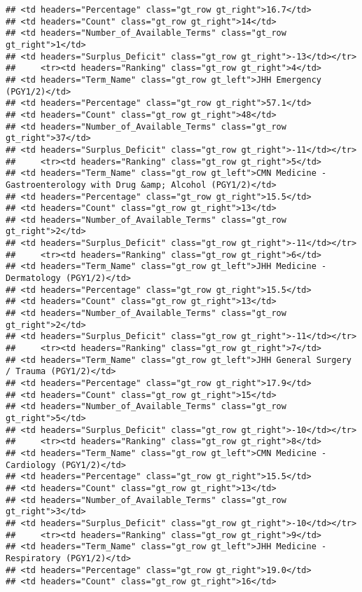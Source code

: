 \documentclass[
]{article}
\begin{document}
\begin{verbatim}
## <td headers="Percentage" class="gt_row gt_right">16.7</td>
## <td headers="Count" class="gt_row gt_right">14</td>
## <td headers="Number_of_Available_Terms" class="gt_row gt_right">1</td>
## <td headers="Surplus_Deficit" class="gt_row gt_right">-13</td></tr>
##     <tr><td headers="Ranking" class="gt_row gt_right">4</td>
## <td headers="Term_Name" class="gt_row gt_left">JHH Emergency (PGY1/2)</td>
## <td headers="Percentage" class="gt_row gt_right">57.1</td>
## <td headers="Count" class="gt_row gt_right">48</td>
## <td headers="Number_of_Available_Terms" class="gt_row gt_right">37</td>
## <td headers="Surplus_Deficit" class="gt_row gt_right">-11</td></tr>
##     <tr><td headers="Ranking" class="gt_row gt_right">5</td>
## <td headers="Term_Name" class="gt_row gt_left">CMN Medicine - Gastroenterology with Drug &amp; Alcohol (PGY1/2)</td>
## <td headers="Percentage" class="gt_row gt_right">15.5</td>
## <td headers="Count" class="gt_row gt_right">13</td>
## <td headers="Number_of_Available_Terms" class="gt_row gt_right">2</td>
## <td headers="Surplus_Deficit" class="gt_row gt_right">-11</td></tr>
##     <tr><td headers="Ranking" class="gt_row gt_right">6</td>
## <td headers="Term_Name" class="gt_row gt_left">JHH Medicine - Dermatology (PGY1/2)</td>
## <td headers="Percentage" class="gt_row gt_right">15.5</td>
## <td headers="Count" class="gt_row gt_right">13</td>
## <td headers="Number_of_Available_Terms" class="gt_row gt_right">2</td>
## <td headers="Surplus_Deficit" class="gt_row gt_right">-11</td></tr>
##     <tr><td headers="Ranking" class="gt_row gt_right">7</td>
## <td headers="Term_Name" class="gt_row gt_left">JHH General Surgery / Trauma (PGY1/2)</td>
## <td headers="Percentage" class="gt_row gt_right">17.9</td>
## <td headers="Count" class="gt_row gt_right">15</td>
## <td headers="Number_of_Available_Terms" class="gt_row gt_right">5</td>
## <td headers="Surplus_Deficit" class="gt_row gt_right">-10</td></tr>
##     <tr><td headers="Ranking" class="gt_row gt_right">8</td>
## <td headers="Term_Name" class="gt_row gt_left">CMN Medicine - Cardiology (PGY1/2)</td>
## <td headers="Percentage" class="gt_row gt_right">15.5</td>
## <td headers="Count" class="gt_row gt_right">13</td>
## <td headers="Number_of_Available_Terms" class="gt_row gt_right">3</td>
## <td headers="Surplus_Deficit" class="gt_row gt_right">-10</td></tr>
##     <tr><td headers="Ranking" class="gt_row gt_right">9</td>
## <td headers="Term_Name" class="gt_row gt_left">JHH Medicine - Respiratory (PGY1/2)</td>
## <td headers="Percentage" class="gt_row gt_right">19.0</td>
## <td headers="Count" class="gt_row gt_right">16</td>

\end{verbatim}
\end{document}

